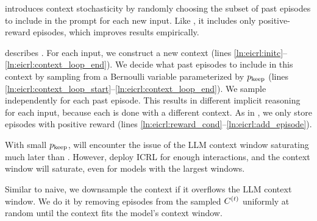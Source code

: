 \expshort introduces context stochasticity by randomly choosing the subset of past episodes to include in the prompt for each new input. 
Like \naiveplus, it includes only positive-reward episodes, which improves results empirically.



 describes \explorative. 
For each input, we construct a new context (lines \ref{ln:eicrl:initc}--\ref{ln:eicrl:context_loop_end}). 
We decide what past episodes to include in this context by sampling from a Bernoulli variable parameterized by $p_\text{keep}$ (lines \ref{ln:eicrl:context_loop_start}--\ref{ln:eicrl:context_loop_end}). 
We sample independently for each past episode. 
This results in different implicit reasoning for each input, because each is done with a different context. 
As in \naiveplusshort, we only store episodes with positive reward (lines \ref{ln:eicrl:reward_cond}--\ref{ln:eicrl:add_episode}).

With small $p_\text{keep}$, \expshort will encounter the issue of the LLM context window saturating much later than \naiveshort. 
However, deploy ICRL for enough interactions, and the context window will saturate, even for models with the largest windows. 

Similar to naive, we downsample the context if it overflows the LLM context window. We do it by removing episodes from the sampled $C^{(t)}$ uniformly at random until the context fits the model's context window. 








